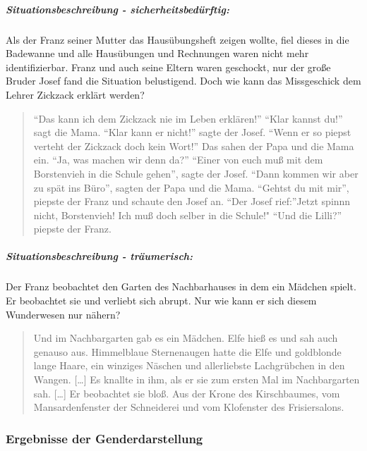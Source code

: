 \subparagraph{Situationsbeschreibung - sicherheitsbedürftig:}

Als der Franz seiner Mutter das Hausübungsheft zeigen wollte, fiel
dieses in die Badewanne und alle Hausübungen und Rechnungen waren nicht
mehr identifizierbar. Franz und auch seine Eltern waren geschockt, nur
der große Bruder Josef fand die Situation belustigend. Doch wie kann das
Missgeschick dem Lehrer Zickzack erklärt werden?

\begin{quote}
``Das kann ich dem Zickzack nie im Leben erklären!'' ``Klar kannst du!''
sagt die Mama. ``Klar kann er nicht!'' sagte der Josef. ``Wenn er so
piepst verteht der Zickzack doch kein Wort!'' Das sahen der Papa und die
Mama ein. ``Ja, was machen wir denn da?'' ``Einer von euch muß mit dem
Borstenvieh in die Schule gehen'', sagte der Josef. ``Dann kommen wir
aber zu spät ins Büro'', sagten der Papa und die Mama. ``Gehtst du mit
mir'', piepste der Franz und schaute den Josef an. ``Der Josef
rief:''Jetzt spinnn nicht, Borstenvieh! Ich muß doch selber in die
Schule!" ``Und die Lilli?'' piepste der Franz.
\parencite[][25]{Noestlinger1996}
\end{quote}

\subparagraph{Situationsbeschreibung - träumerisch:}

Der Franz beobachtet den Garten des Nachbarhauses in dem ein Mädchen
spielt. Er beobachtet sie und verliebt sich abrupt. Nur wie kann er sich
diesem Wunderwesen nur nähern?

\begin{quote}
Und im Nachbargarten gab es ein Mädchen. Elfe hieß es und sah auch
genauso aus. Himmelblaue Sternenaugen hatte die Elfe und goldblonde
lange Haare, ein winziges Näschen und allerliebste Lachgrübchen in den
Wangen. {[}\ldots{}{]} Es knallte in ihm, als er sie zum ersten Mal im
Nachbargarten sah. {[}\ldots{}{]} Er beobachtet sie bloß. Aus der Krone
des Kirschbaumes, vom Mansardenfenster der Schneiderei und vom
Klofenster des Frisiersalons. \parencite[][46]{Noestlinger1991}
\end{quote}

\subsubsection{Ergebnisse der Genderdarstellung}

